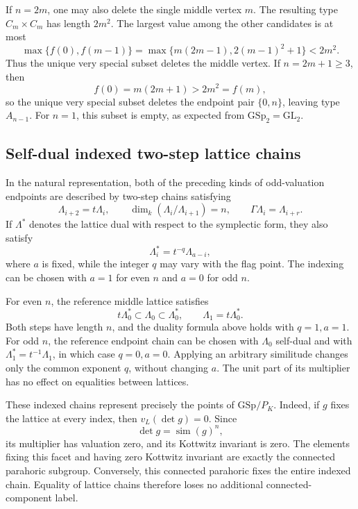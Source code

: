 \documentclass[11pt,a4paper]{article}
\theoremstyle{definition}
\theoremstyle{remark}
\begin{document}
If \(n=2m\), one may also delete the single middle vertex \(m\). The
resulting type \(C_m\times C_m\) has length \(2m^2\). The largest value
among the other candidates is at most
\[
\max\{f(0),f(m-1)\}
=\max\{m(2m-1),2(m-1)^2+1\}<2m^2.
\]
Thus the unique very special subset deletes the middle vertex. If
\(n=2m+1\geq3\), then
\[
f(0)=m(2m+1)>2m^2=f(m),
\]
so the unique very special subset deletes the endpoint pair
\(\{0,n\}\), leaving type \(A_{n-1}\). For \(n=1\), this subset is empty,
as expected from \(\mathrm{GSp}_2=\mathrm{GL}_2\).

\subsection{Self-dual indexed two-step lattice chains}
\label{subsec:ac-two-step-chains}

In the natural representation, both of the preceding kinds of
odd-valuation endpoints are described by two-step chains satisfying
\[
\Lambda_{i+2}=t\Lambda_i,\qquad
\dim_k(\Lambda_i/\Lambda_{i+1})=n,\qquad
\Gamma\Lambda_i=\Lambda_{i+r}.
\]
If \(\Lambda^*\) denotes the lattice dual with respect to the symplectic
form, they also satisfy
\[
\Lambda_i^*=t^{-q}\Lambda_{a-i},
\]
where \(a\) is fixed, while the integer \(q\) may vary with the flag
point. The indexing can be chosen with \(a=1\) for even \(n\) and \(a=0\)
for odd \(n\).

For even \(n\), the reference middle lattice satisfies
\[
t\Lambda_0^*\subset\Lambda_0\subset\Lambda_0^*,\qquad
\Lambda_1=t\Lambda_0^*.
\]
Both steps have length \(n\), and the duality formula above holds with
\(q=1,a=1\). For odd \(n\), the reference endpoint chain can be chosen
with \(\Lambda_0\) self-dual and with
\(\Lambda_1^*=t^{-1}\Lambda_1\), in which case \(q=0,a=0\). Applying an
arbitrary similitude changes only the common exponent \(q\), without
changing \(a\). The unit part of its multiplier has no effect on
equalities between lattices.

These indexed chains represent precisely the points of
\(\mathrm{GSp}/P_K\). Indeed, if \(g\) fixes the lattice at every index,
then \(v_L(\det g)=0\). Since
\[
\det g=\operatorname{sim}(g)^n,
\]
its multiplier has valuation zero, and its Kottwitz invariant is zero.
The elements fixing this facet and having zero Kottwitz invariant are
exactly the connected parahoric subgroup. Conversely, this connected
parahoric fixes the entire indexed chain. Equality of lattice chains
therefore loses no additional connected-component label.
\end{document}
